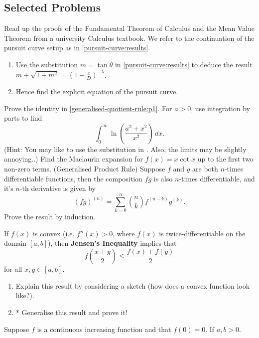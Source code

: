 \documentclass[../jarvis.tex]{subfiles}
\begin{document}
\subsection{Selected Problems}
\problem Read up the proofs of the Fundamental Theorem of Calculus and the Mean Value Theorem from a university Calculus textbook.
\problem We refer to the continuation of the pursuit curve setup as in \ref{pursuit-curve:results}.
\begin{enumerate}
    \item Use the substitution $m=\tan\theta$ in \ref{pursuit-curve:results} to deduce the result $m+\sqrt{1+m^2}=\left(1-\frac{x}{D}\right)^{-\lambda}$.
    \item Hence find the explicit equation of the pursuit curve.
\end{enumerate}
\problem Prove the identity in \ref{generalised-quotient-rule:p1}.
\problem* For $a > 0$, use integration by parts to find
$$\int_{0}^{\infty}\ln{\left(\frac{a^2+x^2}{x^2}\right)}\, dx.$$
(Hint: You may like to use the substitution in . Also, the limits may be slightly annoying..)
\problem Find the Maclaurin expansion for $f(x)=x\cot{x}$ up to the first two non-zero terms.
\problem (Generalised Product Rule) Suppose $f$ and $g$ are both $n$-times differentiable functions, then the composition $fg$ is also $n$-times differentiable, and it's $n$-th derivative is given by
$$(fg)^{(n)}=\sum_{k=0}^{n}\binom{n}{k}f^{(n-k)}g^{(k)}.$$
Prove the result by induction.

\problem If $f(x)$ is convex (i.e. $f''(x)>0$, where $f(x)$ is twice-differentiable on the domain $[a,b]$), then \textbf{Jensen's Inequality} implies that $$f\left(\frac{x+y}{2}\right) \leq \frac{f(x)+f(y)}{2}$$
for all $x,y \in [a,b]$.
\begin{enumerate}
    \item Explain this result by considering a sketch (how does a convex function look like?).
    \item* Generalise this result and prove it!
\end{enumerate}

\problem Suppose $f$ is a continuous increasing function and that $f(0)=0$. If $a, b > 0$. 
\end{document}
